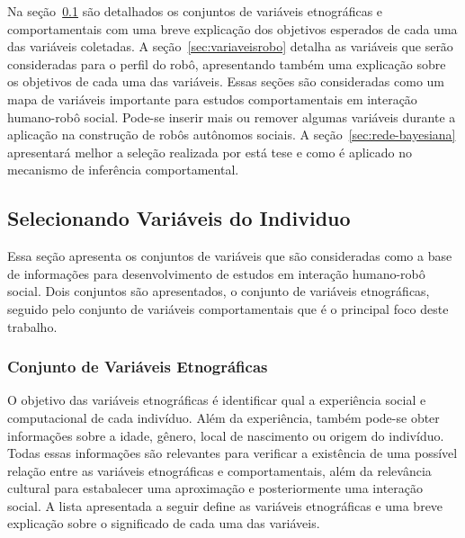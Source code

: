 Na seção~\ref{sec:variaveisindividuo} são detalhados os conjuntos de variáveis etnográficas e comportamentais com uma breve explicação dos objetivos esperados de cada uma das variáveis coletadas. A seção~\ref{sec:variaveisrobo} detalha as variáveis que serão consideradas para o perfil do robô, apresentando também uma explicação sobre os objetivos de cada uma das variáveis. Essas seções são consideradas como um mapa de variáveis importante para estudos comportamentais em interação humano-robô social. Pode-se inserir mais ou remover algumas variáveis durante a aplicação na construção de robôs autônomos sociais. A seção~\ref{sec:rede-bayesiana} apresentará melhor a seleção realizada por está tese e como é aplicado no mecanismo de inferência comportamental.

\subsection{Selecionando Variáveis do Individuo}
\label{sec:variaveisindividuo}

Essa seção apresenta os conjuntos de variáveis que são consideradas como a base de informações para desenvolvimento de estudos em interação humano-robô social. Dois conjuntos são apresentados, o conjunto de variáveis etnográficas, seguido pelo conjunto de variáveis comportamentais que é o principal foco deste trabalho.

\subsubsection{Conjunto de Variáveis Etnográficas}
\label{sec:variaveisetnograficas}

O objetivo das variáveis etnográficas é identificar qual a experiência social e computacional de cada indivíduo. Além da experiência, também pode-se obter informações sobre a idade, gênero, local de nascimento ou origem do indivíduo. Todas essas informações são relevantes para verificar a existência de uma possível relação entre as variáveis etnográficas e comportamentais, além da relevância cultural para estabalecer uma aproximação e posteriormente uma interação social. A lista apresentada a seguir define as variáveis etnográficas e uma breve explicação sobre o significado de cada uma das variáveis.

